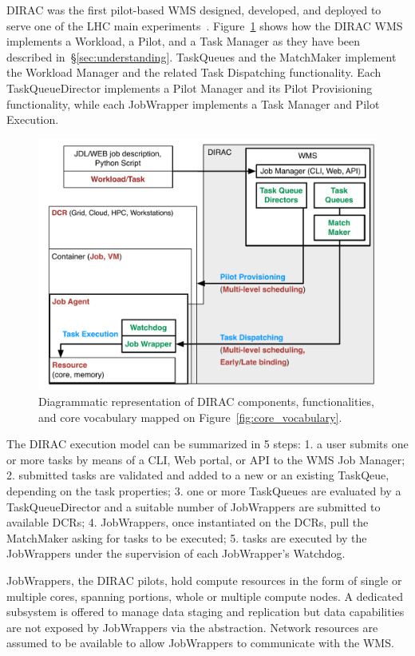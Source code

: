 \documentclass{sig-alternate}
\begin{document}
DIRAC was the first pilot-based WMS designed, developed, and deployed to serve
one of the LHC main experiments~\cite{casajus2010dirac}.
Figure~\ref{fig:dirac_comparison} shows how the DIRAC WMS implements a Workload,
a Pilot, and a Task Manager as they have been described
in~\S\ref{sec:understanding}. TaskQueues and the MatchMaker implement the
Workload Manager and the related Task Dispatching functionality. Each
TaskQueueDirector implements a Pilot Manager and its Pilot Provisioning
functionality, while each JobWrapper implements a Task Manager and Pilot
Execution.

\begin{figure}[t]
    \centering
        \includegraphics[width=.48\textwidth]{figures/dirac_comparison.pdf}
    \caption{Diagrammatic representation of DIRAC components, functionalities,
    and core vocabulary mapped on Figure~\ref{fig:core_vocabulary}.}
    \label{fig:dirac_comparison}
\end{figure}

The DIRAC execution model can be summarized in 5 steps: 1. a user submits one or
more tasks by means of a CLI, Web portal, or API to the WMS Job Manager; 2.
submitted tasks are validated and added to a new or an existing TaskQeue,
depending on the task properties; 3. one or more TaskQueues are evaluated by a
TaskQueueDirector and a suitable number of JobWrappers are submitted to
available DCRs; 4. JobWrappers, once instantiated on the DCRs, pull the
MatchMaker asking for tasks to be executed; 5. tasks are executed by the
JobWrappers under the supervision of each JobWrapper's Watchdog.


JobWrappers, the DIRAC pilots, hold compute resources in the form of single or
multiple cores, spanning portions, whole or multiple compute nodes. A dedicated
subsystem is offered to manage data staging and replication but data
capabilities are not exposed by JobWrappers via the \pilot abstraction. Network
resources are assumed to be available to allow JobWrappers to communicate with
the WMS.
\end{document}
